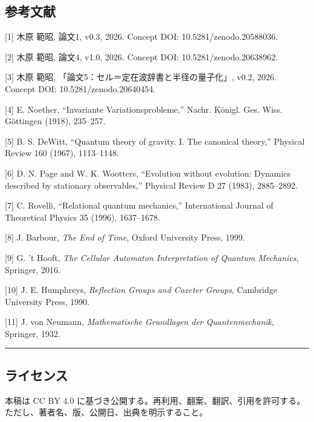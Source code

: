 \documentclass[
]{ltjsarticle}
\begin{document}
\subsection{参考文献}\label{ux53c2ux8003ux6587ux732e}

{[}1{]} 木原 範昭, 論文1, v0.3, 2026. Concept DOI:
10.5281/zenodo.20588036.

{[}2{]} 木原 範昭, 論文4, v1.0, 2026. Concept DOI:
10.5281/zenodo.20638962.

{[}3{]} 木原 範昭, 「論文5：セル＝定在波辞書と半径の量子化」, v0.2,
2026. Concept DOI: 10.5281/zenodo.20640454.

{[}4{]} E. Noether, ``Invariante Variationsprobleme,'' Nachr. Königl.
Ges. Wiss. Göttingen (1918), 235--257.

{[}5{]} B. S. DeWitt, ``Quantum theory of gravity. I. The canonical
theory,'' Physical Review 160 (1967), 1113--1148.

{[}6{]} D. N. Page and W. K. Wootters, ``Evolution without evolution:
Dynamics described by stationary observables,'' Physical Review D 27
(1983), 2885--2892.

{[}7{]} C. Rovelli, ``Relational quantum mechanics,'' International
Journal of Theoretical Physics 35 (1996), 1637--1678.

{[}8{]} J. Barbour, \emph{The End of Time}, Oxford University Press,
1999.

{[}9{]} G. 't Hooft, \emph{The Cellular Automaton Interpretation of
Quantum Mechanics}, Springer, 2016.

{[}10{]} J. E. Humphreys, \emph{Reflection Groups and Coxeter Groups},
Cambridge University Press, 1990.

{[}11{]} J. von Neumann, \emph{Mathematische Grundlagen der
Quantenmechanik}, Springer, 1932.

\begin{center}\rule{0.5\linewidth}{0.5pt}\end{center}

\subsection{ライセンス}\label{ux30e9ux30a4ux30bbux30f3ux30b9}

本稿は CC BY 4.0
に基づき公開する。再利用、翻案、翻訳、引用を許可する。ただし、著者名、版、公開日、出典を明示すること。
\end{document}
